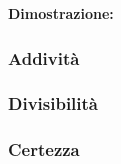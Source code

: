 \documentclass{article}
\begin{document}
        \begin{tcolorbox}
          \textbf{Dimostrazione:} 
        \end{tcolorbox}

      \subsubsection{Addività}

      \subsubsection{Divisibilità}

      \subsubsection{Certezza}
\end{document}
